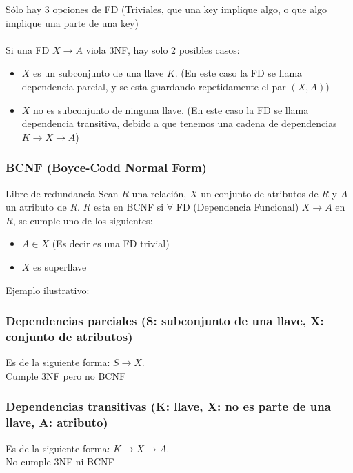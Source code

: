 \documentclass[11pt,letterpaper]{article}
\begin{document}
Sólo hay 3 opciones de FD (Triviales, que una key implique algo, o que algo implique una parte de una key) 
\\\\
Si una FD $X \rightarrow A$ viola 3NF, hay solo 2 posibles casos:
\begin{itemize}
	\item $X$ es un subconjunto de una llave $K$. (En este caso la FD se llama dependencia parcial, y se esta guardando repetidamente el par $(X,A)$)
	\item $X$ no es subconjunto de ninguna llave. (En este caso la FD se llama dependencia transitiva, debido a que tenemos una cadena de dependencias $K \rightarrow X \rightarrow A$)
\end{itemize}

\subsubsection{BCNF (Boyce-Codd Normal Form)}
Libre de redundancia
Sean $R$ una relación, $X$ un conjunto de atributos de $R$ y $A$ un atributo de $R$. 
$R$ esta en BCNF si $\forall$ FD (Dependencia Funcional) $X \rightarrow A$ en $R$, se cumple uno de los siguientes:
\begin{itemize}
	\item $A \in X$ (Es decir es una FD trivial)
	\item $X$ es superllave
\end{itemize}
Ejemplo ilustrativo:
\begin{figure}[h]
\centering
{}
\end{figure}

\subsubsection{Dependencias parciales (S: subconjunto de una llave, X: conjunto de atributos)}
\noindent
Es de la siguiente forma: $S \rightarrow X$.\\
Cumple 3NF pero no BCNF

\subsubsection{Dependencias transitivas (K: llave, X: no es parte de una llave, A: atributo)}\noindent
Es de la siguiente forma: $K \rightarrow X \rightarrow A$.\\
No cumple 3NF ni BCNF
\end{document}
